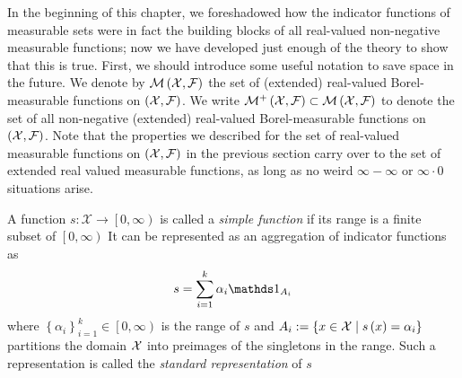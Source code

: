 In the beginning of this chapter, we foreshadowed how the indicator
functions of measurable sets were in fact the building blocks of all
real-valued non-negative measurable functions; now we have developed
just enough of the theory to show that this is true. First, we should
introduce some useful notation to save space in the future. We denote
by $\mathcal{M}\left(\mathcal{X},\mathcal{F}\right)$ the set of (extended)
real-valued Borel-measurable functions on $\left(\mathcal{X},\mathcal{F}\right)$.
We write $\mathcal{M}^{+}\left(\mathcal{X},\mathcal{F}\right)\subset\mathcal{M}\left(\mathcal{X},\mathcal{F}\right)$
to denote the set of all non-negative (extended) real-valued Borel-measurable
functions on $\left(\mathcal{X},\mathcal{F}\right)$. Note that the properties
we described for the set of real-valued measurable functions on $\left(\mathcal{X},\mathcal{F}\right)$
in the previous section carry over to the set of extended real valued
measurable functions, as long as no weird $\infty-\infty$ or $\infty\cdot0$
situations arise.
\begin{defn}
\label{def:simpleFunction} A function $s:\mathcal{X}\longrightarrow\left[0,\infty\right)$
is called a \emph{simple function }if its range is a finite subset
of $\left[0,\infty\right)$ It can be represented as an aggregation
of indicator functions as
\[
s=\sum_{i=1}^{k}\alpha_{i}\indicate_{A_{i}}
\]
where $\left\{ \alpha_{i}\right\} _{i=1}^{k}\in\left[0,\infty\right)$
is the range of $s$ and $A_{i}:=\left\{ x\in\mathcal{X}\mid s\left(x\right)=\alpha_{i}\right\} $
partitions the domain $\mathcal{X}$ into preimages of the singletons in the
range. Such a representation is called the \emph{standard representation
}of $s$
\end{defn}

